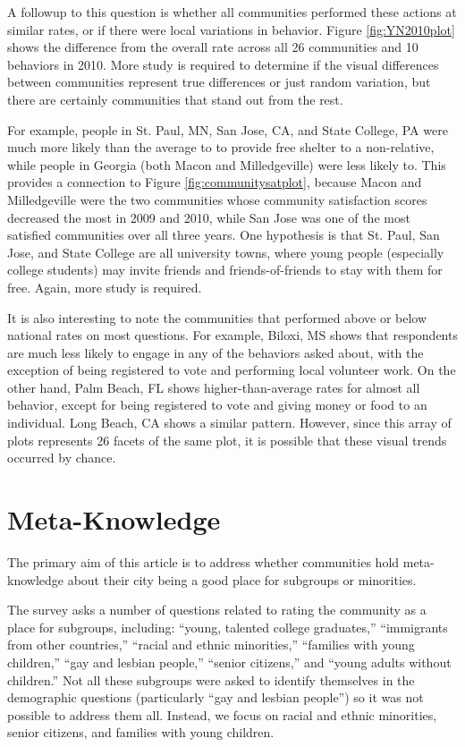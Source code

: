 \documentclass[smallextended]{svjour3}\usepackage[]{graphicx}\usepackage[]{color}
\begin{document}
A followup to this question is whether all communities performed these actions at similar rates, or if there were local variations in behavior. Figure \ref{fig:YN2010plot} shows the difference from the overall rate across all 26 communities and 10 behaviors in 2010. More study is required to determine if the visual differences between communities represent true differences or just random variation, but there are certainly communities that stand out from the rest. 

For example, people in St. Paul, MN, San Jose, CA, and State College, PA were much more likely than the average to to provide free shelter to a non-relative, while people in Georgia (both Macon and Milledgeville) were less likely to. This provides a connection to Figure \ref{fig:communitysatplot}, because Macon and Milledgeville were the two communities whose community satisfaction scores decreased the most in 2009 and 2010, while San Jose was one of the most satisfied communities over all three years. One hypothesis is that St. Paul, San Jose, and State College are all university towns, where young people (especially college students) may invite friends and friends-of-friends to stay with them for free. Again, more study is required. 

It is also interesting to note the communities that performed above or below national rates on most questions. For example, Biloxi, MS shows that respondents are much less likely to engage in any of the behaviors asked about, with the exception of being registered to vote and performing local volunteer work. On the other hand, Palm Beach, FL shows higher-than-average rates for almost all behavior, except for being registered to vote and giving money or food to an individual. Long Beach, CA shows a similar pattern. However, since this array of plots represents 26 facets of the same plot, it is possible that these visual trends occurred by chance. 

\section{Meta-Knowledge}
\label{metasec}
The primary aim  of this article is to address whether communities hold meta-knowledge about their city being a good place for subgroups or minorities. 

The survey asks a number of questions related to rating the community as a place for subgroups, including: ``young, talented college graduates,'' ``immigrants from other countries,'' ``racial and ethnic minorities,'' ``families with young children,'' ``gay and lesbian people,'' ``senior citizens,'' and ``young adults without children.'' Not all these subgroups were asked to identify themselves in the demographic questions (particularly ``gay and lesbian people'') so it was not possible to address them all. Instead, we focus on racial and ethnic minorities, senior citizens, and families with young children.
\end{document}
